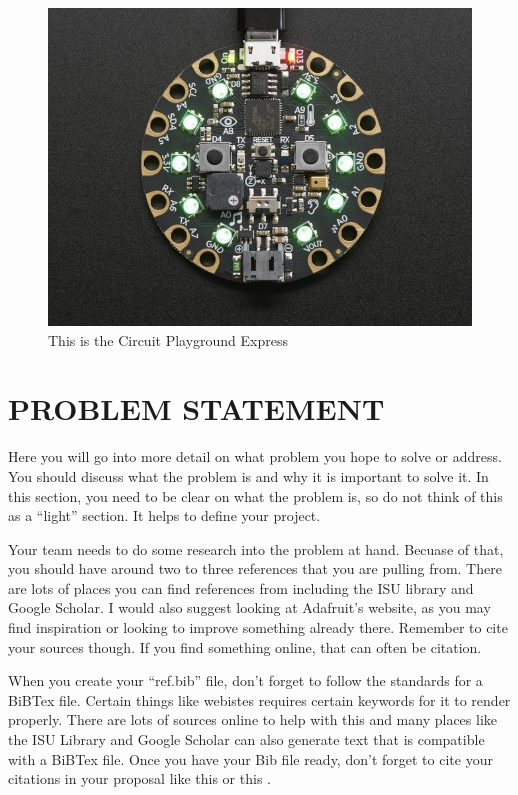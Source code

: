 \documentclass[12pt]{article}
\begin{document}
\begin{figure}[!t]
\centering
\includegraphics[width=4.5in]{cpx01.jpg}
\caption{This is the Circuit Playground Express}
\label{fig:cpx}
\end{figure}

\section{PROBLEM STATEMENT}
Here you will go into more detail on what problem you hope to solve or address.  You should discuss what the problem is and why it is important to solve it. In this section, you need to be clear on what the problem is, so do not think of this as a ``light'' section. It helps to define your project.

Your team needs to do some research into the problem at hand. Becuase of that, you should have around two to three references that you are pulling from. There are lots of places you can find references from including the ISU library and Google Scholar. I would also suggest looking at Adafruit's website, as you may find inspiration or looking to improve something already there. Remember to cite your sources though. If you find something online, that can often be citation.

When you create your ``ref.bib'' file, don't forget to follow the standards for a BiBTex file. Certain things like webistes requires certain keywords for it to render properly. There are lots of sources online to help with this and many places like the ISU Library and Google Scholar can also generate text that is compatible with a BiBTex file. Once you have your Bib file ready, don't forget to cite your citations in your proposal like this \cite{einstein} or this \cite{dirac}.
\end{document}
